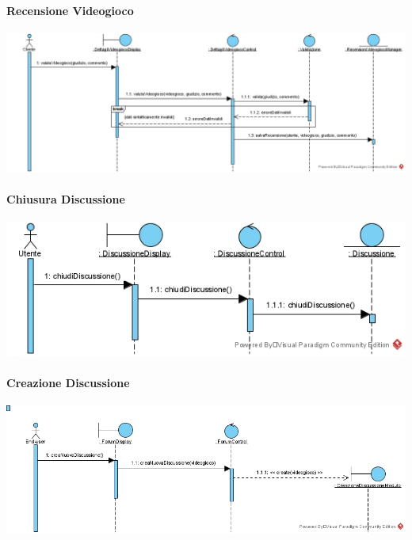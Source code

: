 \paragraph{Recensione Videogioco}
\begin{center}
\includegraphics[width=\textwidth,height=\textheight,keepaspectratio]{Figure/SequenceDiagrams/RecensioneVideogioco.jpg}
\end{center}

\newpage
\paragraph{Chiusura Discussione}
\begin{center}
\includegraphics[width=\textwidth,height=\textheight,keepaspectratio]{Figure/SequenceDiagrams/ChiusuraDiscussione.jpg}
\end{center}

\paragraph{Creazione Discussione}
\begin{center}
\includegraphics[width=\textwidth,height=\textheight,keepaspectratio]{Figure/SequenceDiagrams/CreazioneDiscussioneEntry.jpg}
\end{center}


